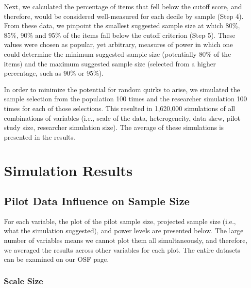\documentclass[
  man]{apa7}
\begin{document}
Next, we calculated the percentage of items that fell below the cutoff score, and therefore, would be considered well-measured for each decile by sample (Step 4). From these data, we pinpoint the smallest suggested sample size at which 80\%, 85\%, 90\% and 95\% of the items fall below the cutoff criterion (Step 5). These values were chosen as popular, yet arbitrary, measures of power in which one could determine the minimum suggested sample size (potentially 80\% of the items) and the maximum suggested sample size (selected from a higher percentage, such as 90\% or 95\%).

In order to minimize the potential for random quirks to arise, we simulated the sample selection from the population 100 times and the researcher simulation 100 times for each of those selections. This resulted in 1,620,000 simulations of all combinations of variables (i.e., scale of the data, heterogeneity, data skew, pilot study size, researcher simulation size). The average of these simulations is presented in the results.

\section{Simulation Results}\label{simulation-results}

\subsection{Pilot Data Influence on Sample Size}\label{pilot-data-influence-on-sample-size}

For each variable, the plot of the pilot sample size, projected sample size (i.e., what the simulation suggested), and power levels are presented below. The large number of variables means we cannot plot them all simultaneously, and therefore, we averaged the results across other variables for each plot. The entire datasets can be examined on our OSF page.

\subsubsection{Scale Size}\label{scale-size}
\end{document}
